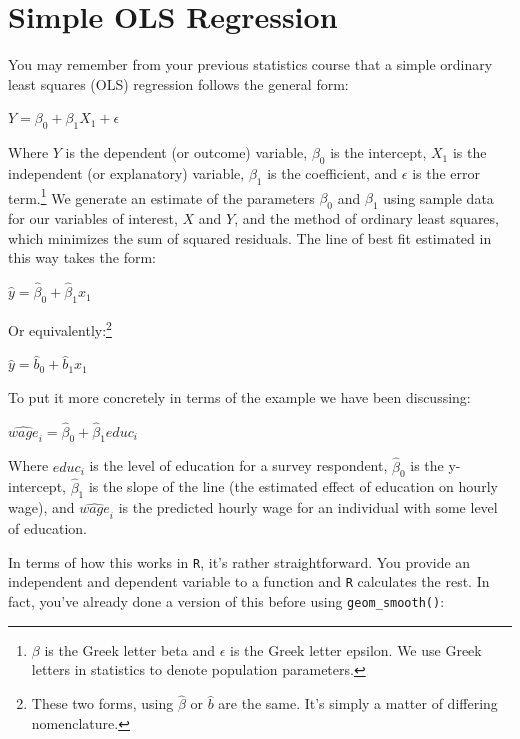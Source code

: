 \documentclass[
  letterpaper,
]{book}
\begin{document}
\hypertarget{simple-ols-regression}{%
\section{Simple OLS Regression}\label{simple-ols-regression}}

You may remember from your previous statistics course that a simple
ordinary least squares (OLS) regression follows the general form:

\(Y = \beta_{0} +\beta_{1}X_{1} + \epsilon\)

Where \(Y\) is the dependent (or outcome) variable, \(\beta_{0}\) is the
intercept, \(X_1\) is the independent (or explanatory) variable,
\(\beta_{1}\) is the coefficient, and \(\epsilon\) is the error
term.\footnote{\(\beta\) is the Greek letter beta and \(\epsilon\) is
  the Greek letter epsilon. We use Greek letters in statistics to denote
  population parameters.} We generate an estimate of the parameters
\(\beta_{0}\) and \(\beta_{1}\) using sample data for our variables of
interest, \(X\) and \(Y\), and the method of ordinary least squares,
which minimizes the sum of squared residuals. The line of best fit
estimated in this way takes the form:

\(\hat{y} = \hat{\beta}_{0} + \hat{\beta}_{1}x_1\)

Or equivalently:\footnote{These two forms, using \(\hat{\beta}\) or
  \(\hat{b}\) are the same. It's simply a matter of differing
  nomenclature.}

\(\hat{y} = \hat{b}_{0} + \hat{b}_{1}x_1\)

To put it more concretely in terms of the example we have been
discussing:

\(\widehat{\textit{wage}}_{i} = \hat{\beta}_{0} + \hat{\beta}_{1}{\textit{educ}}_{i}\)

Where \(\textit{educ}_i\) is the level of education for a survey
respondent, \(\hat{\beta}_{0}\) is the y-intercept, \(\hat{\beta}_{1}\)
is the slope of the line (the estimated effect of education on hourly
wage), and \(\widehat{\textit{wage}}_{i}\) is the predicted hourly wage
for an individual with some level of education.

In terms of how this works in \texttt{R}, it's rather straightforward.
You provide an independent and dependent variable to a function and
\texttt{R} calculates the rest. In fact, you've already done a version
of this before using \texttt{geom\_smooth()}:
\end{document}
